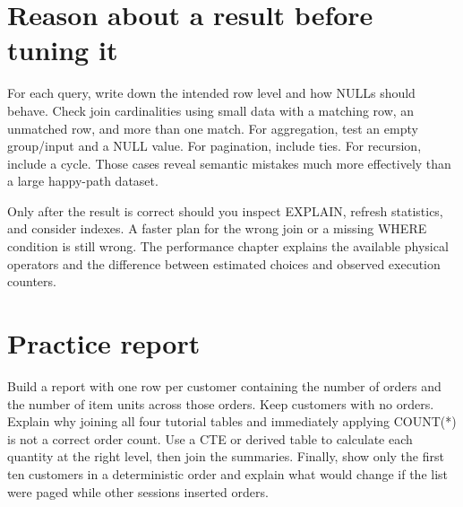 \section{Reason about a result before tuning it}

For each query, write down the intended row level and how NULLs should behave. Check join cardinalities using small data with a matching row, an unmatched row, and more than one match. For aggregation, test an empty group/input and a NULL value. For pagination, include ties. For recursion, include a cycle. Those cases reveal semantic mistakes much more effectively than a large happy-path dataset.

Only after the result is correct should you inspect EXPLAIN, refresh statistics, and consider indexes. A faster plan for the wrong join or a missing WHERE condition is still wrong. The performance chapter explains the available physical operators and the difference between estimated choices and observed execution counters.

\section{Practice report}

Build a report with one row per customer containing the number of orders and the number of item units across those orders. Keep customers with no orders. Explain why joining all four tutorial tables and immediately applying COUNT(*) is not a correct order count. Use a CTE or derived table to calculate each quantity at the right level, then join the summaries. Finally, show only the first ten customers in a deterministic order and explain what would change if the list were paged while other sessions inserted orders.
